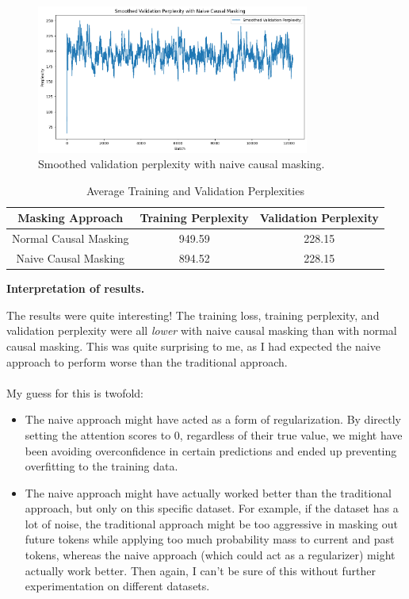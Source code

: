 \documentclass{article}
\begin{document}
\begin{figure}[htbp]
    \centering
    \includegraphics[width=0.8\textwidth]{plots/validationpplnaive98.png}
    \caption{Smoothed validation perplexity with naive causal masking.}
    \label{fig:validationpplnaive}
\end{figure}
\newpage
\begin{table}[htbp]
    \centering
    \begin{tabular}{|c|c|c|}
        \hline
        \textbf{Masking Approach} & \textbf{Training Perplexity} &
        \textbf{Validation Perplexity} \\
        \hline
        Normal Causal Masking & 949.59 & 228.15 \\
        \hline
        Naive Causal Masking & 894.52 & 228.15 \\
        \hline
    \end{tabular}
    \caption{Average Training and Validation Perplexities}
\end{table}

\textbf{Interpretation of results.}

The results were quite interesting! The training loss, training perplexity, and
validation perplexity were all \textit{lower} with naive causal masking than
with normal causal masking. This was quite surprising to me, as I had expected
the naive approach to perform worse than the traditional approach.\\\\
My guess for this is twofold:

\begin{itemize}
    \item The naive approach might have acted as a form of regularization. By
    directly setting the attention scores to 0, regardless of their true value,
    we might have been avoiding overconfidence in certain predictions and ended
    up preventing overfitting to the training data.
    \item The naive approach might have actually worked better than the
    traditional approach, but only on this specific dataset. For example, if the
    dataset has a lot of noise, the traditional approach might be too aggressive
    in masking out future tokens while applying too much probability mass to
    current and past tokens, whereas the naive approach (which could act as a
    regularizer) might actually work better. Then again, I can't be sure of this
    without further experimentation on different datasets.
\end{itemize}
\end{document}
